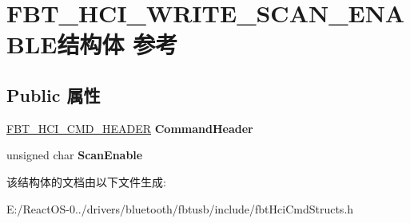 \hypertarget{struct_f_b_t___h_c_i___w_r_i_t_e___s_c_a_n___e_n_a_b_l_e}{}\section{F\+B\+T\+\_\+\+H\+C\+I\+\_\+\+W\+R\+I\+T\+E\+\_\+\+S\+C\+A\+N\+\_\+\+E\+N\+A\+B\+L\+E结构体 参考}
\label{struct_f_b_t___h_c_i___w_r_i_t_e___s_c_a_n___e_n_a_b_l_e}
\subsection*{Public 属性}
\begin{DoxyCompactItemize}
\item 
\mbox{\label{struct_f_b_t___h_c_i___w_r_i_t_e___s_c_a_n___e_n_a_b_l_e_a2f2541742f9c15987e15c40d1d37a637}} 
\hyperlink{struct_f_b_t___h_c_i___c_m_d___h_e_a_d_e_r}{F\+B\+T\+\_\+\+H\+C\+I\+\_\+\+C\+M\+D\+\_\+\+H\+E\+A\+D\+ER} {\bfseries Command\+Header}
\item 
\mbox{\label{struct_f_b_t___h_c_i___w_r_i_t_e___s_c_a_n___e_n_a_b_l_e_a5f9ef39ef8f1f5b8f2d3951f4cba273a}} 
unsigned char {\bfseries Scan\+Enable}
\end{DoxyCompactItemize}


该结构体的文档由以下文件生成\+:\begin{DoxyCompactItemize}
\item 
E\+:/\+React\+O\+S-\/0../drivers/bluetooth/fbtusb/include/fbt\+Hci\+Cmd\+Structs.\+h\end{DoxyCompactItemize}

